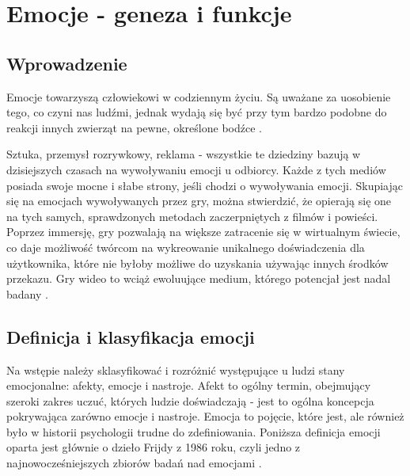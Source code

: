 \chapter{Emocje - geneza i funkcje}
\label{chap:drugi}



\section{Wprowadzenie}

Emocje towarzyszą człowiekowi w codziennym życiu. Są uważane za uosobienie tego, co czyni nas ludźmi, jednak wydają się być przy tym bardzo podobne do reakcji innych zwierząt na pewne, określone bodźce \citep{website:emotion}.

Sztuka, przemysł rozrywkowy, reklama - wszystkie te dziedziny bazują w dzisiejszych czasach na wywoływaniu emocji u odbiorcy. Każde z tych mediów posiada swoje mocne i słabe strony, jeśli chodzi o wywoływania emocji. Skupiając się na emocjach wywoływanych przez gry, można stwierdzić, że opierają się one na tych samych, sprawdzonych metodach zaczerpniętych z filmów i powieści. Poprzez immersję, gry pozwalają na większe zatracenie się w wirtualnym świecie, co daje możliwość twórcom na wykreowanie unikalnego doświadczenia dla użytkownika, które nie byłoby możliwe do uzyskania używając innych środków przekazu. Gry wideo to wciąż ewoluujące medium, którego potencjał jest nadal badany \citep{button}.

\section{Definicja i klasyfikacja emocji}
Na wstępie należy sklasyfikować i rozróżnić występujące u ludzi stany emocjonalne: afekty, emocje i nastroje. Afekt to ogólny termin, obejmujący szeroki zakres uczuć, których ludzie doświadczają - jest to ogólna koncepcja pokrywająca zarówno emocje i nastroje. Emocja to pojęcie, które jest, ale również było w historii psychologii trudne do zdefiniowania. Poniższa definicja emocji oparta jest głównie o dzieło Frijdy z 1986 roku, czyli jedno z najnowocześniejszych zbiorów badań nad emocjami \citep{oatly}.

